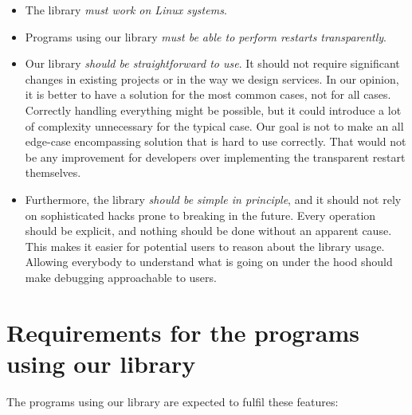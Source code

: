 \begin{itemize}
\item The library \emph{must work on Linux systems}.
    
\item Programs using our library \emph{must be able to perform restarts transparently}.

\item Our library \emph{should be straightforward to use}. It should not require significant changes in existing projects or in the way we design services. In our opinion, it is better to have a solution for the most common cases, not for all cases. Correctly handling everything might be possible, but it could introduce a lot of complexity unnecessary for the typical case. Our goal is not to make an all edge-case encompassing solution that is hard to use correctly. That would not be any improvement for developers over implementing the transparent restart themselves.

\item Furthermore, the library \emph{should be simple in principle}, and it should not rely on sophisticated hacks prone to breaking in the future. Every operation should be explicit, and nothing should be done without an apparent cause. This makes it easier for potential users to reason about the library usage. Allowing everybody to understand what is going on under the hood should make debugging approachable to users.
\end{itemize}

\section{Requirements for the programs using our library}

The programs using our library are expected to fulfil these features:

